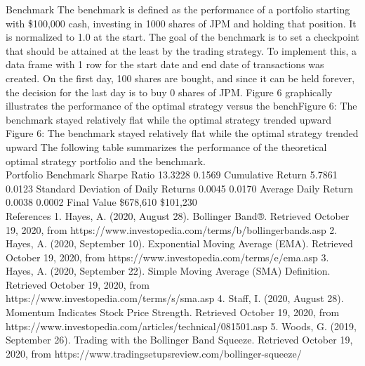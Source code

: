 \documentclass{article}
\begin{document}
Benchmark
The benchmark is defined as the performance of a portfolio starting with \$100,000 cash, investing in 1000 shares of JPM and holding that position. It is normalized to 1.0 at the start. The goal of the benchmark is to set a checkpoint that should be attained at the least by the trading strategy. 
To implement this, a data frame with 1 row for the start date and end date of transactions was created. On the first day, 100 shares are bought, and since it can be held forever, the decision for the last day is to buy 0 shares of JPM. Figure 6 graphically illustrates the performance of the optimal strategy versus the benchFigure 6: The benchmark stayed relatively flat while the optimal strategy trended upward
Figure 6: The benchmark stayed relatively flat while the optimal strategy trended upward
The following table summarizes the performance of the theoretical optimal strategy portfolio and the benchmark.\\

Portfolio
Benchmark
Sharpe Ratio
13.3228
0.1569
Cumulative Return
5.7861
0.0123
Standard Deviation of Daily Returns
0.0045
0.0170
Average Daily Return
0.0038
0.0002
Final Value
\$678,610
\$101,230\\

References
1. Hayes, A. (2020, August 28). Bollinger Band®. Retrieved October 19, 2020, from https://www.investopedia.com/terms/b/bollingerbands.asp 
2. Hayes, A. (2020, September 10). Exponential Moving Average (EMA). Retrieved October 19, 2020, from https://www.investopedia.com/terms/e/ema.asp 
3. Hayes, A. (2020, September 22). Simple Moving Average (SMA) Definition. Retrieved October 19, 2020, from https://www.investopedia.com/terms/s/sma.asp
4. Staff, I. (2020, August 28). Momentum Indicates Stock Price Strength. Retrieved October 19, 2020, from https://www.investopedia.com/articles/technical/081501.asp
5. Woods, G. (2019, September 26). Trading with the Bollinger Band Squeeze. Retrieved October 19, 2020, from https://www.tradingsetupsreview.com/bollinger-squeeze/\\
\end{document}
